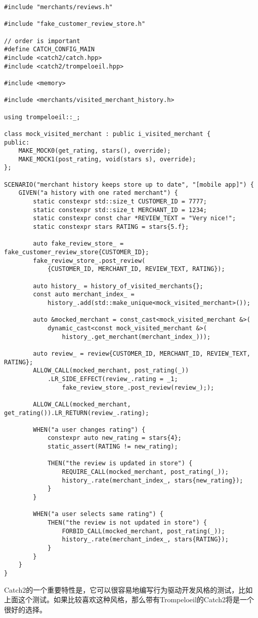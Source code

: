 \begin{lstlisting}[style=styleCXX]
#include "merchants/reviews.h"

#include "fake_customer_review_store.h"

// order is important
#define CATCH_CONFIG_MAIN
#include <catch2/catch.hpp>
#include <catch2/trompeloeil.hpp>

#include <memory>

#include <merchants/visited_merchant_history.h>

using trompeloeil::_;

class mock_visited_merchant : public i_visited_merchant {
public:
	MAKE_MOCK0(get_rating, stars(), override);
	MAKE_MOCK1(post_rating, void(stars s), override);
};

SCENARIO("merchant history keeps store up to date", "[mobile app]") {
	GIVEN("a history with one rated merchant") {
		static constexpr std::size_t CUSTOMER_ID = 7777;
		static constexpr std::size_t MERCHANT_ID = 1234;
		static constexpr const char *REVIEW_TEXT = "Very nice!";
		static constexpr stars RATING = stars{5.f};
		
		auto fake_review_store_ = fake_customer_review_store{CUSTOMER_ID};
		fake_review_store_.post_review(
			{CUSTOMER_ID, MERCHANT_ID, REVIEW_TEXT, RATING});
		
		auto history_ = history_of_visited_merchants{};
		const auto merchant_index_ =
			history_.add(std::make_unique<mock_visited_merchant>());
			
		auto &mocked_merchant = const_cast<mock_visited_merchant &>(
			dynamic_cast<const mock_visited_merchant &>(
				history_.get_merchant(merchant_index_)));
				
		auto review_ = review{CUSTOMER_ID, MERCHANT_ID, REVIEW_TEXT, RATING};
		ALLOW_CALL(mocked_merchant, post_rating(_))
			.LR_SIDE_EFFECT(review_.rating = _1;
				fake_review_store_.post_review(review_););
	
		ALLOW_CALL(mocked_merchant, get_rating()).LR_RETURN(review_.rating);
		
		WHEN("a user changes rating") {
			constexpr auto new_rating = stars{4};
			static_assert(RATING != new_rating);
			
			THEN("the review is updated in store") {
				REQUIRE_CALL(mocked_merchant, post_rating(_));
				history_.rate(merchant_index_, stars{new_rating});
			}
		}
	
		WHEN("a user selects same rating") {
			THEN("the review is not updated in store") {
				FORBID_CALL(mocked_merchant, post_rating(_));
				history_.rate(merchant_index_, stars{RATING});
			}
		}
	}
}
\end{lstlisting}

Catch2的一个重要特性是，它可以很容易地编写行为驱动开发风格的测试，比如上面这个测试。如果比较喜欢这种风格，那么带有Trompeloeil的Catch2将是一个很好的选择。























